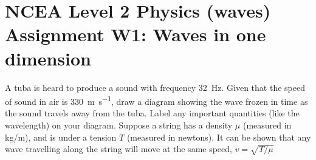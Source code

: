 \documentclass[answers]{exam}
\begin{document}
\section*{NCEA Level 2 Physics (waves)\\Assignment W1: Waves in one dimension}

\begin{questions}
  \question A tuba is heard to produce a sound with frequency \SI{32}{\hertz}. Given that
            the speed of sound in air is \SI{330}{\metre\per\second}, draw a diagram showing
            the wave frozen in time as the sound travels away from the tuba. Label any important
            quantities (like the wavelength) on your diagram.
  \question Suppose a string has a density $ \mu $ (measured in kg/m), and is under a tension $ T $
            (measured in newtons). It can be shown that any wave travelling along the string
            will move at the same speed, $ v = \sqrt{T/\mu} $
\end{questions}
\end{document}
